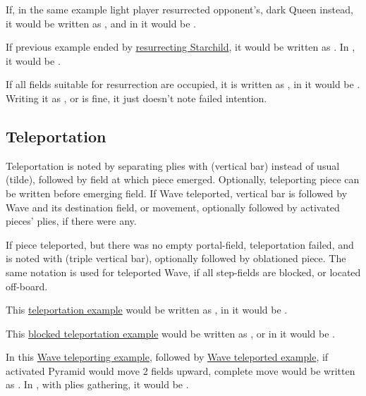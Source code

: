If, in the same example light player resurrected opponent's, dark Queen instead, it would
be written as , and in  it would be .

If previous example ended by
\hyperref[fig:scn_o_53_syzygy_starchild_resurrection]{resurrecting Starchild}, it would
be written as . In , it would be .

If all fields suitable for resurrection are occupied, it is written as ,
in  it would be . Writing it as , or 
is fine, it just doesn't note failed intention.


\subsection*{Teleportation}
\label{sec:Appendix/Notation/Teleportation}

Teleportation is noted by separating plies with \alg{|} (vertical bar) instead of
usual \alg{\textasciitilde{}} (tilde), followed by field at which piece emerged.
Optionally, teleporting piece can be written before emerging field. If Wave teleported,
vertical bar is followed by Wave and its destination field, or movement, optionally
followed by activated pieces' plies, if there were any.

If piece teleported, but there was no empty portal-field, teleportation failed,
and is noted with \alg{|||} (triple vertical bar), optionally followed by oblationed
piece. The same notation is used for teleported Wave, if all step-fields are blocked,
or located off-board.

This \hyperref[fig:scn_n_02_teleport_init]{teleportation example} would be written as
, in  it would be .

This \hyperref[fig:scn_n_03_teleport_move_2]{blocked teleportation example} would be
written as , or in  it would be .

In this \hyperref[fig:scn_n_04_teleport_move_3]{Wave teleporting example}, followed by
\hyperref[fig:scn_n_05_teleport_end]{Wave teleported example}, if activated Pyramid
would move 2 fields upward, complete move would be written as\newline
{}. In , with plies
gathering, it would be\newline
\alg{[Ei11-g15]\textasciitilde{}[Wg15-a18]|[Wr1-l4]\textasciitilde{}[Al4-l6]}.

